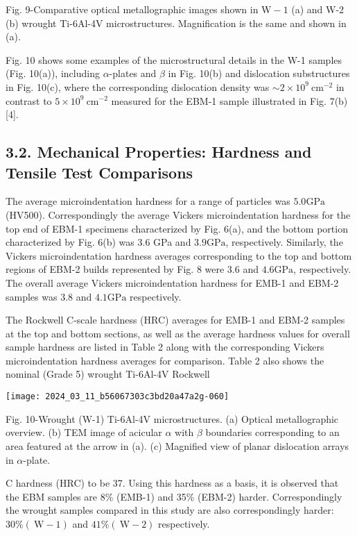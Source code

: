\documentclass[10pt]{article}
\begin{document}
Fig. 9-Comparative optical metallographic images shown in $\mathrm{W}-1$ (a) and W-2 (b) wrought Ti-6Al-4V microstructures. Magnification is the same and shown in (a).

Fig. 10 shows some examples of the microstructural details in the W-1 samples (Fig. 10(a)), including $\alpha$-plates and $\beta$ in Fig. 10(b) and dislocation substructures in Fig. 10(c), where the corresponding dislocation density was $\sim 2 \times 10^{9} \mathrm{~cm}^{-2}$ in contrast to $5 \times 10^{9} \mathrm{~cm}^{-2}$ measured for the EBM-1 sample illustrated in Fig. 7(b) [4].

\subsection*{3.2. Mechanical Properties: Hardness and Tensile Test Comparisons}
The average microindentation hardness for a range of particles was $5.0 \mathrm{GPa}$ (HV500). Correspondingly the average Vickers microindentation hardness for the top end of EBM-1 specimens characterized by Fig. 6(a), and the bottom portion characterized by Fig. 6(b) was 3.6 GPa and $3.9 \mathrm{GPa}$, respectively. Similarly, the Vickers microindentation hardness averages corresponding to the top and bottom regions of EBM-2 builds represented by Fig. 8 were 3.6 and $4.6 \mathrm{GPa}$, respectively. The overall average Vickers microindentation hardness for EMB-1 and EBM-2 samples was 3.8 and $4.1 \mathrm{GPa}$ respectively.

The Rockwell C-scale hardness (HRC) averages for EMB-1 and EBM-2 samples at the top and bottom sections, as well as the average hardness values for overall sample hardness are listed in Table 2 along with the corresponding Vickers microindentation hardness averages for comparison. Table 2 also shows the nominal (Grade 5) wrought Ti-6Al-4V Rockwell

\begin{center}
\texttt{[image: 2024\_03\_11\_b56067303c3bd20a47a2g-060]}
\end{center}

Fig. 10-Wrought (W-1) Ti-6Al-4V microstructures. (a) Optical metallographic overview. (b) TEM image of acicular $\alpha$ with $\beta$ boundaries corresponding to an area featured at the arrow in (a). (c) Magnified view of planar dislocation arrays in $\alpha$-plate.

C hardness (HRC) to be 37. Using this hardness as a basis, it is observed that the EBM samples are 8\% (EMB-1) and 35\% (EBM-2) harder. Correspondingly the wrought samples compared in this study are also correspondingly harder: $30 \%(\mathrm{~W}-1)$ and $41 \%(\mathrm{~W}-2)$ respectively.
\end{document}
